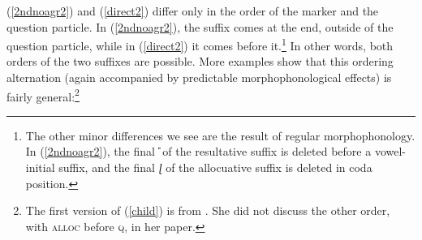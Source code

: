 \documentclass[output=paper, modfonts, nonflat]{langsci/langscibook}
\begin{document}
\ea
 \z
\z
%
(\ref{2ndnoagr2}) and (\ref{direct2}) differ only in the order of the
\allagr{} marker and the question particle.  In (\ref{2ndnoagr2}), the
\allagr{} suffix comes at the end, outside of the question particle,
while in (\ref{direct2}) it comes before it.\footnote{The other minor
  differences we see are the result of regular morphophonology. In
  (\ref{2ndnoagr2}), the final \textit{\U} of the resultative suffix
  is deleted before a vowel-initial suffix, and the final \textit{ɭ}
  of the allocuative suffix is deleted in coda position.} In other
words, both orders of the two suffixes are possible. More examples
show that this ordering alternation (again accompanied by predictable
morphophonological effects) is fairly general:\footnote{The first
  version of (\ref{child}) is from \citet{amrit:1991}. She did not
  discuss the other order, with \textsc{alloc}{} before \textsc{q}, in her
  paper.}
\end{document}
